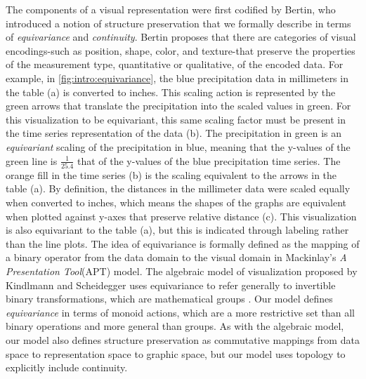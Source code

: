 \documentclass[../main.tex]{subfiles}
\begin{document}
The components of a visual representation were first codified by Bertin\cite{bertinSemiologyGraphicsDiagrams2011a}, who introduced a notion of structure preservation that we formally describe in terms of \textit{equivariance} and \textit{continuity}. Bertin proposes that there are categories of visual encodings-such as position, shape, color, and texture-that preserve the properties of the measurement type, quantitative or qualitative, of the encoded data. For example, in \autoref{fig:intro:equivariance}, the blue precipitation data in millimeters in the table (a) is converted to inches. This scaling action is represented by the green arrows that translate the precipitation into the scaled values in green. For this visualization to be equivariant, this same scaling factor must be present in the time series representation of the data (b). The precipitation in green is an \textit{equivariant} scaling of the precipitation in blue, meaning that the y-values of the green line is $\frac{1}{25.4}$ that of the y-values of the blue precipitation time series. The orange fill in the time series (b) is the scaling equivalent to the arrows in the table (a). By definition, the distances in the millimeter data were scaled equally \cite{stothersKleinViewGeometry} when converted to inches, which means the shapes of the graphs are equivalent when plotted against y-axes that preserve relative distance (c). This visualization is also equivariant to the table (a), but this is indicated through labeling rather than the line plots. The idea of equivariance is formally defined as the mapping of a binary operator from the data domain to the visual domain in Mackinlay's \textit{A Presentation Tool}(APT) model\cite{mackinlayAutomatingDesignGraphical1986, mackinlayAutomaticDesignGraphical1987}. The algebraic model of visualization proposed by Kindlmann and Scheidegger uses equivariance to refer generally to invertible binary transformations\cite{kindlmannAlgebraicProcessVisualization2014}, which are mathematical groups \cite{shadrachIntroductionGroups2017}. Our model defines \textit{equivariance} in terms of monoid actions, which are a more restrictive set than all binary operations and more general than groups. As with the algebraic model, our model also defines structure preservation as commutative mappings from data space to representation space to graphic space, but our model uses topology to explicitly include continuity.
\end{document}
